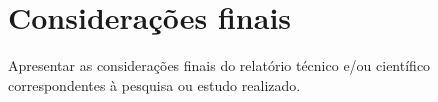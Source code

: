 \chapter{Considerações finais}
Apresentar as considerações finais do relatório técnico e/ou científico correspondentes à pesquisa ou estudo realizado.
